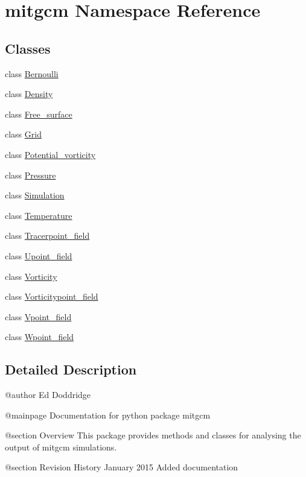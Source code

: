 \hypertarget{namespacemitgcm}{\section{mitgcm Namespace Reference}
\label{namespacemitgcm}
}
\subsection*{Classes}
\begin{DoxyCompactItemize}
\item 
class \hyperlink{classmitgcm_1_1Bernoulli}{Bernoulli}
\item 
class \hyperlink{classmitgcm_1_1Density}{Density}
\item 
class \hyperlink{classmitgcm_1_1Free__surface}{Free\+\_\+surface}
\item 
class \hyperlink{classmitgcm_1_1Grid}{Grid}
\item 
class \hyperlink{classmitgcm_1_1Potential__vorticity}{Potential\+\_\+vorticity}
\item 
class \hyperlink{classmitgcm_1_1Pressure}{Pressure}
\item 
class \hyperlink{classmitgcm_1_1Simulation}{Simulation}
\item 
class \hyperlink{classmitgcm_1_1Temperature}{Temperature}
\item 
class \hyperlink{classmitgcm_1_1Tracerpoint__field}{Tracerpoint\+\_\+field}
\item 
class \hyperlink{classmitgcm_1_1Upoint__field}{Upoint\+\_\+field}
\item 
class \hyperlink{classmitgcm_1_1Vorticity}{Vorticity}
\item 
class \hyperlink{classmitgcm_1_1Vorticitypoint__field}{Vorticitypoint\+\_\+field}
\item 
class \hyperlink{classmitgcm_1_1Vpoint__field}{Vpoint\+\_\+field}
\item 
class \hyperlink{classmitgcm_1_1Wpoint__field}{Wpoint\+\_\+field}
\end{DoxyCompactItemize}


\subsection{Detailed Description}
\begin{DoxyVerb}@author
Ed Doddridge

@mainpage Documentation for python package mitgcm

@section Overview
This package provides methods and classes for analysing the output of mitgcm simulations.


@section Revision History
January 2015
Added documentation
\end{DoxyVerb}
 
